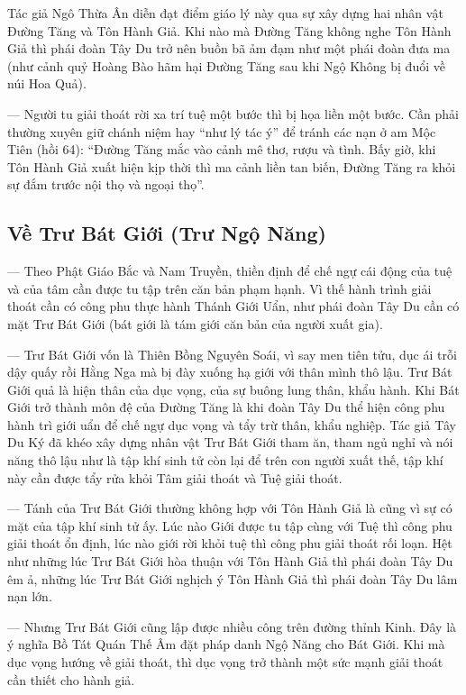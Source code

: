 Tác giả Ngô Thừa Ân diễn đạt điểm giáo lý này qua sự xây dựng hai nhân vật Đường Tăng và Tôn Hành Giả. Khi nào mà Đường Tăng không nghe Tôn Hành Giả thì phái đoàn Tây Du trở nên buồn bã ảm đạm như một phái đoàn đưa ma (như cảnh quỷ Hoàng Bào hãm hại Đường Tăng sau khi Ngộ Không bị đuổi về núi Hoa Quả).

— Người tu giải thoát rời xa trí tuệ một bước thì bị họa liền một bước. Cần phải thường xuyên giữ chánh niệm hay ``như lý tác ý'' để tránh các nạn ở am Mộc Tiên (hồi 64): ``Đường Tăng mắc vào cảnh mê thơ, rượu và tình. Bấy giờ, khi Tôn Hành Giả xuất hiện kịp thời thì ma cảnh liền tan biến, Đường Tăng ra khỏi sự đắm trước nội thọ và ngoại thọ''.
\subsection{Về Trư Bát Giới (Trư Ngộ Năng)} %
\label{sub:ve_tru_bat_gioi}

— Theo Phật Giáo Bắc và Nam Truyền, thiền định để chế ngự cái động của tuệ và của tâm cần được tu tập trên căn bản phạm hạnh. Vì thế hành trình giải thoát cần có công phu thực hành Thánh Giới Uẩn, như phái đoàn Tây Du cần có mặt Trư Bát Giới (bát giới là tám giới căn bản của người xuất gia).

— Trư Bát Giới vốn là Thiên Bồng Nguyên Soái, vì say men tiên tửu, dục ái trỗi dậy quấy rồi Hằng Nga mà bị đày xuống hạ giới với thân mình thô lậu. Trư Bát Giới quả là hiện thân của dục vọng, của sự buông lung thân, khẩu hành. Khi Bát Giới trở thành môn đệ của Đường Tăng là khi đoàn Tây Du thể hiện công phu hành trì giới uẩn để chế ngự dục vọng và tẩy trừ thân, khẩu nghiệp. Tác giả Tây Du Ký đã khéo xây dựng nhân vật Trư Bát Giới tham ăn, tham ngủ nghỉ và nói năng thô lậu như là tập khí sinh tử còn lại để trên con người xuất thế, tập khí này cần được tẩy rửa khỏi Tâm giải thoát và Tuệ giải thoát.

— Tánh của Trư Bát Giới thường không hợp với Tôn Hành Giả là cũng vì sự có mặt của tập khí sinh tử ấy. Lúc nào Giới được tu tập cùng với Tuệ thì công phu giải thoát ổn định, lúc nào giới rời khỏi tuệ thì công phu giải thoát rối loạn. Hệt như những lúc Trư Bát Giới hòa thuận với Tôn Hành Giả thì phái đoàn Tây Du êm ả, những lúc Trư Bát Giới nghịch ý Tôn Hành Giả thì phái đoàn Tây Du lâm nạn lớn.

— Nhưng Trư Bát Giới cũng lập được nhiều công trên đường thỉnh Kinh. Đây là ý nghĩa Bồ Tát Quán Thế Âm đặt pháp danh Ngộ Năng cho Bát Giới. Khi mà dục vọng hướng về giải thoát, thì dục vọng trở thành một sức mạnh giải thoát cần thiết cho hành giả.


